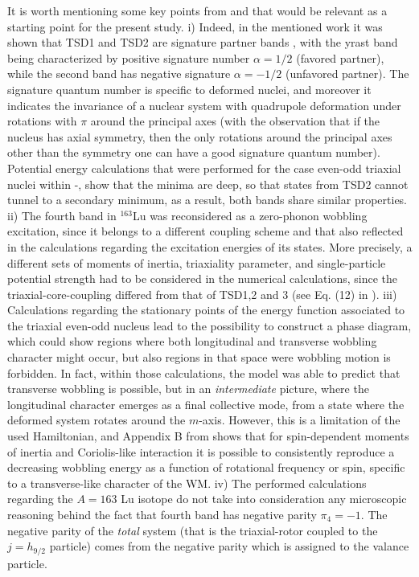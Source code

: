 \documentclass[%
 reprint,
 amsmath,
 amssymb,
 aps,
]{revtex4-2}
\begin{document}
It is worth mentioning some key points from \cite{raduta2020towards} and \cite{raduta2020new} that would be relevant as a starting point for the present study. i) Indeed, in the mentioned work it was shown that TSD1 and TSD2 are signature partner bands \cite{sun1994varied}, with the yrast band being characterized by positive signature number $\alpha=1/2$ (favored partner), while the second band has negative signature $\alpha=-1/2$ (unfavored partner). The signature quantum number is specific to deformed nuclei, and moreover it indicates the invariance of a nuclear system with quadrupole deformation under rotations with $\pi$ around the principal axes (with the observation that if the nucleus has axial symmetry, then the only rotations around the principal axes other than the symmetry one can have a good signature quantum number). Potential energy calculations that were performed for the case even-odd triaxial nuclei within \cite{raduta2016specific}-\cite{raduta2017semiclassical}, show that the minima are deep, so that states from TSD2 cannot tunnel to a secondary minimum, as a result, both bands share similar properties. ii) The fourth band in $^{163}$Lu was reconsidered as a zero-phonon wobbling excitation, since it belongs to a different coupling scheme and that also reflected in the calculations regarding the excitation energies of its states. More precisely, a different sets of moments of inertia, triaxiality parameter, and single-particle potential strength had to be considered in the numerical calculations, since the triaxial-core-coupling differed from that of TSD1,2 and 3 (see Eq. (12) in \cite{raduta2020new}). iii) Calculations regarding the stationary points of the energy function associated to the triaxial even-odd nucleus lead to the possibility to construct a phase diagram, which could show regions where both longitudinal and transverse wobbling character might occur, but also regions in that space were wobbling motion is forbidden. In fact, within those calculations, the model was able to predict that transverse wobbling is possible, but in an \emph{intermediate} picture, where the longitudinal character emerges as a final collective mode, from a state where the deformed system rotates around the $m$-axis. However, this is a limitation of the used Hamiltonian, and Appendix B from \cite{raduta2020new} shows that for spin-dependent moments of inertia and Coriolis-like interaction it is possible to consistently reproduce a decreasing wobbling energy as a function of rotational frequency or spin, specific to a transverse-like character of the WM. iv) The performed calculations regarding the $A=163$ Lu isotope do not take into consideration any microscopic reasoning behind the fact that fourth band has negative parity $\pi_4=-1$. The negative parity of the \emph{total} system (that is the triaxial-rotor coupled to the $j=h_{9/2}$ particle) comes from the negative parity which is assigned to the valance particle.  
\end{document}
